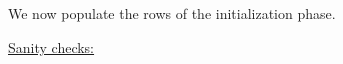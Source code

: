 
We now populate the rows of the initialization phase.
\begin{description}
	\item[\underline{\underline{Sanity checks:}}]
		
		
		
		
\end{description}
